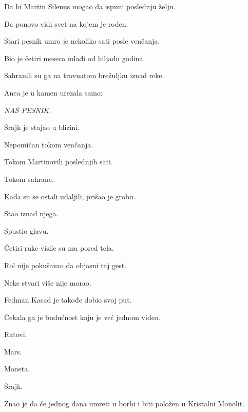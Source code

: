 \bigskip

Da bi Martin Silenus mogao da ispuni poslednju želju.

\bigskip

Da ponovo vidi svet na kojem je rođen.

\bigskip

Stari pesnik umro je nekoliko sati posle venčanja.

\bigskip

Bio je četiri meseca mlađi od hiljadu godina.

\bigskip

Sahranili su ga na travnatom brežuljku iznad reke.

\bigskip

Anea je u kamen urezala samo:

\bigskip

\emph{NAŠ PESNIK.}

\bigskip

Šrajk je stajao u blizini.

\bigskip

Nepomičan tokom venčanja.

Tokom Martinovih poslednjih sati.

Tokom sahrane.

\bigskip

Kada su se ostali udaljili, prišao je grobu.

\bigskip

Stao iznad njega.

Spustio glavu.

\bigskip

Četiri ruke visile su mu pored tela.

\bigskip

Rol nije pokušavao da objasni taj gest.

\bigskip

Neke stvari više nije morao.

\bigskip

Fedman Kasad je takođe dobio svoj put.

\bigskip

Čekala ga je budućnost koju je već jednom video.

Ratovi.

Mars.

Moneta.

Šrajk.

\bigskip

Znao je da će jednog dana umreti u borbi i biti položen u Kristalni Monolit.

